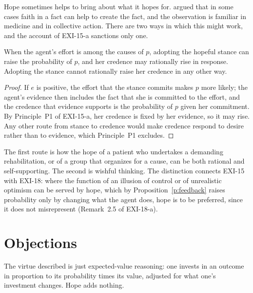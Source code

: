\documentclass{situationist-preprint}
\begin{document}
Hope sometimes helps to bring about what it hopes for. \citet{James1897} argued that in some cases faith in a fact can help to create the fact, and the observation is familiar in medicine and in collective action. There are two ways in which this might work, and the account of EXI-15-a sanctions only one.

\begin{proposition}\label{p:feedback}
When the agent's effort is among the causes of $p$, adopting the hopeful stance can raise the probability of $p$, and her credence may rationally rise in response. Adopting the stance cannot rationally raise her credence in any other way.
\end{proposition}

\begin{proof}
If $e$ is positive, the effort that the stance commits makes $p$ more likely; the agent's evidence then includes the fact that she is committed to the effort, and the credence that evidence supports is the probability of $p$ given her commitment. By Principle~P1 of EXI-15-a, her credence is fixed by her evidence, so it may rise. Any other route from stance to credence would make credence respond to desire rather than to evidence, which Principle~P1 excludes.
\end{proof}

The first route is how the hope of a patient who undertakes a demanding rehabilitation, or of a group that organizes for a cause, can be both rational and self-supporting. The second is wishful thinking. The distinction connects EXI-15 with EXI-18: where the function of an illusion of control or of unrealistic optimism can be served by hope, which by Proposition~\ref{p:feedback} raises probability only by changing what the agent does, hope is to be preferred, since it does not misrepresent (Remark~2.5 of EXI-18-a).

\section{Objections}

\begin{objection}
The virtue described is just expected-value reasoning: one invests in an outcome in proportion to its probability times its value, adjusted for what one's investment changes. Hope adds nothing.
\end{objection}
\end{document}
